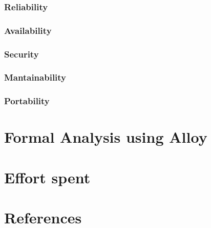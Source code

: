\documentclass{article}
\begin{document}
\subsubsection{Reliability}
\subsubsection{Availability}
\subsubsection{Security}
\subsubsection{Mantainability}
\subsubsection{Portability}
\section{Formal Analysis using Alloy}
\section{Effort spent}
\section{References}
    
\end{document}
